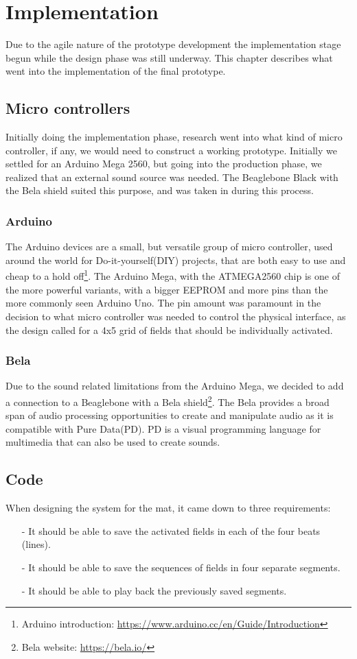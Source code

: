 \chapter{Implementation}%
Due to the agile nature of the prototype development the implementation stage begun while the design phase was still underway. This chapter describes what went into the implementation of the final prototype.

\section{Micro controllers}%
	Initially doing the implementation phase, research went into what kind of micro controller, if any, we would need to construct a working prototype. Initially we settled for an Arduino Mega 2560, but going into the production phase, we realized that an external sound source was needed. The Beaglebone Black with the Bela shield suited this purpose, and was taken in during this process.
	\subsection{Arduino}%
		The Arduino devices are a small, but versatile group of micro controller, used around the world for Do-it-yourself(DIY) projects, that are both easy to use and cheap to a hold off\footnote{Arduino introduction: \url{https://www.arduino.cc/en/Guide/Introduction}}. The Arduino Mega, with the ATMEGA2560 chip is one of the more powerful variants, with a bigger EEPROM and more pins than the more commonly seen Arduino Uno. The pin amount was paramount in the decision to what micro controller was needed to control the physical interface, as the design called for a 4x5 grid of fields that should be individually activated. 
		
	\subsection{Bela}%
		Due to the sound related limitations from the Arduino Mega, we decided to add a connection to a Beaglebone with a Bela shield\footnote{Bela website: \url{https://bela.io/}}. The Bela provides a broad span of audio processing opportunities to create and manipulate audio as it is compatible with Pure Data(PD). PD is a visual programming language for multimedia that can also be used to create sounds.
	
\section{Code}
	When designing the system for the mat, it came down to three requirements:
	\begin{itemize}
		\item[-] It should be able to save the activated fields in each of the four beats (lines).
		\item[-] It should be able to save the sequences of fields in four separate segments.
		\item[-] It should be able to play back the previously saved segments.
	\end{itemize}
